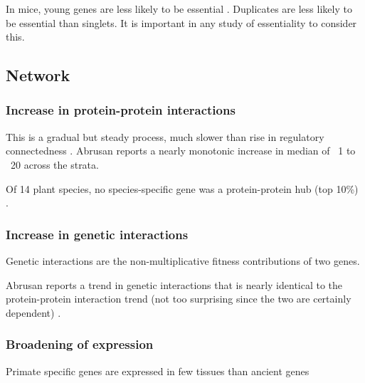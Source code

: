     In mice, young genes are less likely to be essential
    \cite{chen_younger_2012}. Duplicates are less likely to be essential
    than singlets. It is important in any study of essentiality to consider
    this.



    \FloatBarrier

\subsection{Network}

  \subsubsection{Increase in protein-protein interactions}

    This is a gradual but steady process, much slower than rise in
    regulatory connectedness \cite{abrusan_integration_2013}. Abrusan
    reports a nearly monotonic increase in median of ~1 to ~20 across
    the strata.

    Of 14 plant species, no species-specific gene was a protein-protein
    hub (top 10\%) \cite{ye_evolutionary_2013}.

    \FloatBarrier

  \subsubsection{Increase in genetic interactions}

    Genetic interactions are the non-multiplicative fitness
    contributions of two genes.

    Abrusan reports a trend in genetic interactions that is nearly
    identical to the protein-protein interaction trend (not too
    surprising since the two are certainly dependent)
    \cite{abrusan_integration_2013}.

  \subsubsection{Broadening of expression}

    Primate specific genes are expressed in few tissues than ancient
    genes \cite{toll-riera_origin_2009}

